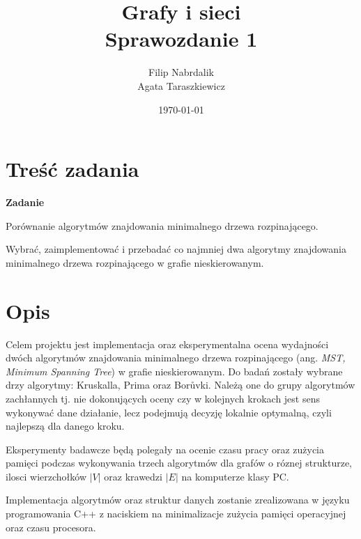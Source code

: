 \documentclass[a4paper, 10pt]{article}
\title{{\bf {Grafy i sieci}} \\ {\large Sprawozdanie 1}}
\date{\today}
\author{Filip Nabrdalik \\Agata Taraszkiewicz}
\begin{document}

\null  %
\nointerlineskip  %
\vfill
\let\snewpage \newpage
\let\newpage \relax
\maketitle 
\let \newpage \snewpage
\vfill
\break %

\tableofcontents

\newpage

\newcommand{\ang}[1]{(ang. {\em #1}\/)}
\newcommand{\e}[1]{{\em #1}\/}





\section{Treść zadania}

{\bf{Zadanie}}

Porównanie algorytmów znajdowania minimalnego drzewa rozpinającego.

Wybrać, zaimplementować i przebadać co najmniej dwa algorytmy znajdowania minimalnego drzewa rozpinającego w grafie nieskierowanym. 


\section{Opis}


Celem projektu jest implementacja oraz eksperymentalna ocena wydajności dwóch algorytmów znajdowania minimalnego drzewa rozpinającego \ang{MST, Minimum Spanning Tree} 
w grafie nieskierowanym. Do badań zostały wybrane drzy algorytmy: Kruskalla, Prima oraz Borůvki. Należą one do grupy algorytmów zachłannych tj. nie dokonujących oceny czy w kolejnych krokach 
jest sens wykonywać dane działanie, lecz podejmują decyzję lokalnie optymalną, czyli najlepszą dla danego kroku.


Eksperymenty badawcze będą polegały na ocenie czasu pracy oraz zużycia pamięci podczas wykonywania trzech algorytmów dla grafów o róznej strukturze, ilosci wierzchołków $|V|$ 
oraz krawedzi $|E|$ na komputerze klasy PC. 

Implementacja algorytmów oraz struktur danych zostanie zrealizowana w języku programowania C++ z naciskiem na minimalizacje zużycia pamięci operacyjnej
oraz czasu procesora. 






\subsection{}



\nocite{*}

\end{document}
